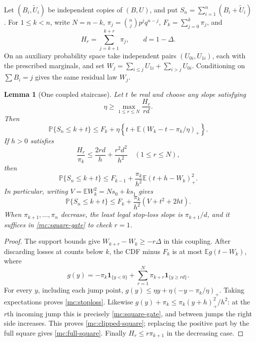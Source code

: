 \documentclass[aop,preprint]{imsart}
\newtheorem{lemma}[theorem]{Lemma}
\theoremstyle{definition}
\newcommand{\E}{\mathbb E}
\newcommand{\PP}{\mathbb P}
\numberwithin{equation}{section}
\begin{document}
Let $(B_i,\widetilde U_i)$ be independent copies of $(B,U)$, and put
$S_n=\sum_{i=1}^n(B_i+\widetilde U_i)$. For $1\le k<n$,
write $N=n-k$, $\pi_j=\binom njp^jq^{n-j}$,
$F_k=\sum_{j=0}^k\pi_j$, and
\[
 H_r=\sum_{j=k+1}^{k+r}\pi_j,\qquad d=1-\Delta.
\]
On an auxiliary probability space take independent pairs
$(U_{0i},U_{1i})$, each with the prescribed marginals, and set
$W_j=\sum_{i\le j}U_{1i}+\sum_{i>j}U_{0i}$.
Conditioning on $\sum B_i=j$ gives the same residual law $W_j$.

\begin{lemma}[One coupled staircase]\label{mc:staircase}
Let $t$ be real and choose any slope satisfying
\[
 \eta\ge\max_{1\le r\le N}\frac{H_r}{rd}.
\]
Then
\begin{equation}\label{mc:stoploss}
 \PP\{S_n\le k+t\}
 \le F_k+\eta\left\{t+\E(W_k-t-\pi_k/\eta)_+\right\}.
\end{equation}
If $h>0$ satisfies
\begin{equation}\label{mc:square-gate}
 \frac{H_r}{\pi_k}\le\frac{2rd}{h}+\frac{r^2d^2}{h^2}
 \quad(1\le r\le N),
\end{equation}
then
\begin{equation}\label{mc:clipped-square}
 \PP\{S_n\le k+t\}
 \le F_{k-1}+\frac{\pi_k}{h^2}\E(t+h-W_k)_+^2.
\end{equation}
In particular, writing $V=\E W_k^2=Ns_0+ks_1$ gives
\begin{equation}\label{mc:full-square}
 \PP\{S_n\le k+t\}
 \le F_k+\frac{\pi_k}{h^2}(V+t^2+2ht).
\end{equation}
When $\pi_{k+1},\ldots,\pi_n$ decrease, the least legal stop-loss
slope is $\pi_{k+1}/d$, and it suffices in
\eqref{mc:square-gate} to check $r=1$.
\end{lemma}
\begin{proof}
The support bounds give $W_{k+r}-W_k\ge-r\Delta$ in this coupling.
After discarding losses at counts below $k$, the CDF minus $F_k$
is at most $\E g(t-W_k)$, where
\[
 g(y)=-\pi_k\mathbf1_{\{y<0\}}
       +\sum_{r=1}^N\pi_{k+r}\mathbf1_{\{y\ge rd\}}.
\]
For every $y$, including each jump point,
$g(y)\le\eta y+\eta(-y-\pi_k/\eta)_+$.
Taking expectations proves \eqref{mc:stoploss}.
Likewise $g(y)+\pi_k\le\pi_k(y+h)_+^2/h^2$:
at the $r$th incoming jump this is precisely
\eqref{mc:square-gate}, and between jumps the right side increases.
This proves \eqref{mc:clipped-square}; replacing the positive part
by the full square gives \eqref{mc:full-square}.
Finally $H_r\le r\pi_{k+1}$ in the decreasing case.
\end{proof}
\end{document}
